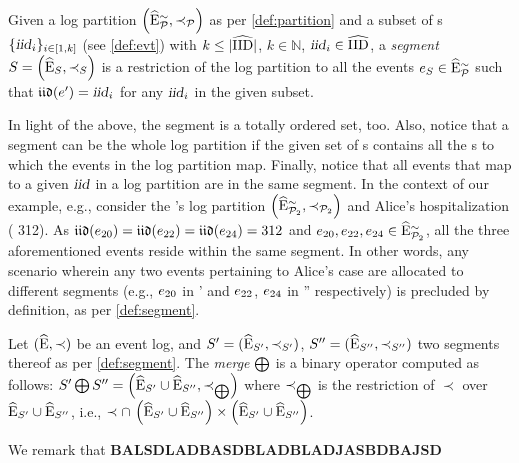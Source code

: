 \begin{newj}
\begin{definition}[Segment]\label{def:segment}
	Given a log partition $\left( \widehat{\mathrm{E}}^{\sim}_{\mathcal{P}}, \prec_{\mathcal{P}} \right)$ as per \cref{def:partition} and a subset of {\CId}s $\{\textrm{\textsl{iid}}_i\}_{i \in [1,k]}$ (see \cref{def:evt}) with $k \leq |\widehat{\mathrm{IID}}|$, $k \in \mathbb{N}$, $\textrm{\textsl{iid}}_i \in \widehat{\mathrm{IID}}$, a \emph{segment} $S = \left( \widehat{\mathrm{E}}_{S}, \prec_{S} \right)$ is a restriction of the log partition to all the events $e_{S} \in \widehat{\mathrm{E}}^{\sim}_{\mathcal{P}}$ such that $\mathfrak{iid}(e') = \textrm{\textsl{iid}}_i$ for any $\textrm{\textsl{iid}}_i$ in the given subset. 
\end{definition}
%
In light of the above, the segment is a totally ordered set, too. Also, notice that a segment can be the whole log partition if the given set of {\CId}s contains all the {\CId}s to which the events in the log partition map. Finally, notice that all events that map to a given $\textrm{\textsl{iid}}$ in a log partition are in the same segment. In the context of our example, e.g., consider the 's log partition $\left( \widehat{\mathrm{E}}^{\sim}_{\mathcal{P}_{2}}, \prec_{\mathcal{P}_{2}} \right)$ and Alice's hospitalization ({\CId} 312). As $\mathfrak{iid}(e_{20}) = \mathfrak{iid}(e_{22}) = \mathfrak{iid}(e_{24}) = 312$ and $ e_{20}, e_{22}, e_{24} \in \widehat{\mathrm{E}}^{\sim}_{\mathcal{P}_2} $, all the three aforementioned events reside within the same segment. In other words, any scenario wherein any two events pertaining to Alice's case are allocated to different segments (e.g., $e_{20}$ in \Segm' and $e_{22}$, $e_{24}$ in \Segm'' respectively) is precluded by definition, as per \cref{def:segment}.


\begin{definition}[Merge]\label{def:merge}
	Let $(\widehat{\mathrm{E}}, \prec)$ be an event log, and
	${S' = (\widehat{\mathrm{E}}_{S'}, \prec_{S'})}$,
	${S'' = (\widehat{\mathrm{E}}_{S''}, \prec_{S''})}$ two segments thereof as per \cref{def:segment}. 
	The \emph{merge} $\bigoplus$ is a binary operator computed as follows: 
	$S' \bigoplus S'' = \left(\widehat{\mathrm{E}}_{S'} \cup \widehat{\mathrm{E}}_{S''}, \prec_{\bigoplus} \right)$ 
	where 
	$\prec_{\bigoplus}$ is the restriction of $\prec$ over $\widehat{\mathrm{E}}_{S'} \cup \widehat{\mathrm{E}}_{S''}$, i.e.,  $\prec \cap\, \left(\widehat{\mathrm{E}}_{S'} \cup \widehat{\mathrm{E}}_{S''}\right) \times \left(\widehat{\mathrm{E}}_{S'} \cup \widehat{\mathrm{E}}_{S''}\right)$. 
\end{definition}
%
We remark that \textbf{BALSDLADBASDBLADBLADJASBDBAJSD}



\end{newj}
